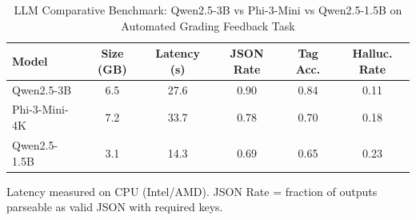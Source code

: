 \begin{table}[h]
\centering
\caption{LLM Comparative Benchmark: Qwen2.5-3B vs Phi-3-Mini vs Qwen2.5-1.5B on Automated Grading Feedback Task}
\label{tab:llm_benchmark}
\begin{tabular}{lccccc}
\hline
Model & Size (GB) & Latency (s) & JSON Rate & Tag Acc. & Halluc. Rate \\ \hline
Qwen2.5-3B & 6.5 & 27.6 & 0.90 & 0.84 & 0.11 \\
Phi-3-Mini-4K & 7.2 & 33.7 & 0.78 & 0.70 & 0.18 \\
Qwen2.5-1.5B & 3.1 & 14.3 & 0.69 & 0.65 & 0.23 \\
\hline
\end{tabular}
\begin{tablenotes}
\item Latency measured on CPU (Intel/AMD). JSON Rate = fraction of outputs parseable as valid JSON with required keys.
\end{tablenotes}
\end{table}